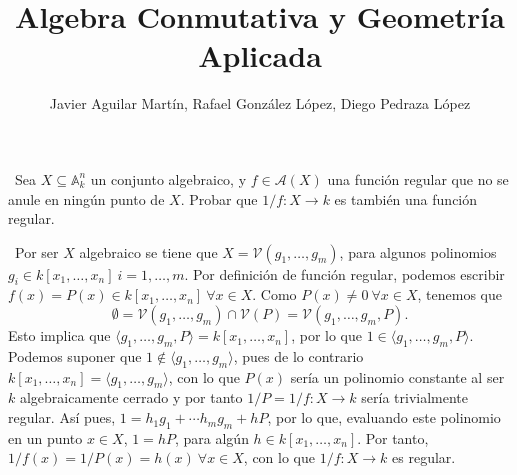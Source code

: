 \documentclass[twoside]{article}
\begin{document}
\title{Algebra Conmutativa y Geometría Aplicada}
\author{Javier Aguilar Martín, Rafael González López, Diego Pedraza López}
\maketitle

\begin{ejercicio}{2}\
Sea $X \subseteq \mathbb{A}^n_k$
un conjunto algebraico, y $f \in \mathcal{A}(X)$ una función
regular que no se anule en ningún punto de $X$. Probar que $1/f : X \to k$ es
también una función regular.
\end{ejercicio}
\begin{solucion}\
Por ser $X$ algebraico se tiene que $X=\mathcal{V}(g_1,\dots,g_m)$, para algunos polinomios $g_i\in k[x_1,\dots,x_n]\ i=1,\dots,m$. Por definición de función regular, podemos escribir $f(x)=P(x)\in k[x_1,\dots, x_n]\ \forall x\in X$. Como $P(x)\neq 0\ \forall x\in X$, tenemos que 
$$\emptyset=\mathcal{V}(g_1,\dots,g_m)\cap\mathcal{V}(P)=\mathcal{V}(g_1,\dots,g_m,P).$$
Esto implica que $\langle g_1,\dots,g_m,P\rangle=k[x_1,\dots, x_n]$, por lo que $1\in \langle g_1,\dots,g_m,P\rangle$. Podemos suponer que $1\notin \langle g_1,\dots,g_m\rangle$, pues de lo contrario $k[x_1,\dots, x_n]=\langle g_1,\dots,g_m\rangle$, con lo que $P(x)$ sería un polinomio constante al ser $k$ algebraicamente cerrado y por tanto $1/P=1/f:X\to k$ sería trivialmente regular. Así pues, $1= h_1g_1+\cdots h_mg_m+hP$, por lo que, evaluando este polinomio en un punto $x\in X$, $1=hP$, para algún $h\in k[x_1,\dots, x_n]$. Por tanto, $1/f(x)=1/P(x)=h(x)\ \forall x\in X$, con lo que $1/f:X\to k$ es regular. 


\end{solucion}

\newpage
\end{document}
